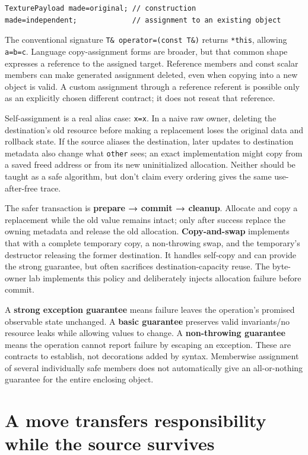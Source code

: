 \begin{verbatim}
TexturePayload made=original; // construction
made=independent;             // assignment to an existing object
\end{verbatim}

The conventional signature \texttt{T\&\ operator=(const\ T\&)} returns \texttt{*this}, allowing \texttt{a=b=c}. Language copy-assignment forms are broader, but that common shape expresses a reference to the assigned target. Reference members and const scalar members can make generated assignment deleted, even when copying into a new object is valid. A custom assignment through a reference referent is possible only as an explicitly chosen different contract; it does not reseat that reference.

Self-assignment is a real alias case: \texttt{x=x}. In a naive raw owner, deleting the destination's old resource before making a replacement loses the original data and rollback state. If the source aliases the destination, later updates to destination metadata also change what \texttt{other} sees; an exact implementation might copy from a saved freed address or from its new uninitialized allocation. Neither should be taught as a safe algorithm, but don't claim every ordering gives the same use-after-free trace.

The safer transaction is \textbf{prepare → commit → cleanup}. Allocate and copy a replacement while the old value remains intact; only after success replace the owning metadata and release the old allocation. \textbf{Copy-and-swap} implements that with a complete temporary copy, a non-throwing swap, and the temporary's destructor releasing the former destination. It handles self-copy and can provide the strong guarantee, but often sacrifices destination-capacity reuse. The byte-owner lab implements this policy and deliberately injects allocation failure before commit.

A \textbf{strong exception guarantee} means failure leaves the operation's promised observable state unchanged. A \textbf{basic guarantee} preserves valid invariants/no resource leaks while allowing values to change. A \textbf{non-throwing guarantee} means the operation cannot report failure by escaping an exception. These are contracts to establish, not decorations added by syntax. Memberwise assignment of several individually safe members does not automatically give an all-or-nothing guarantee for the entire enclosing object.

\section{A move transfers responsibility while the source survives}\label{01-foundations-i-ch003-a-move-transfers-responsibility-while-the-source-survives}

